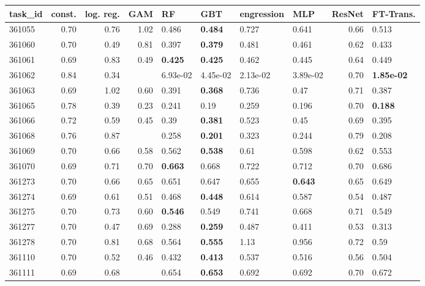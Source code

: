 \begin{table}[ht!]
\centering
\begingroup\footnotesize
\begin{tabular}{lrrrllllrl}
  \hline
\hline
task\_id & const. & log. reg. & GAM & RF & GBT & engression & MLP & ResNet & FT-Trans. \\ 
  \hline
361055 & 0.70 & 0.76 & 1.02 & 0.486 & \textbf{0.484} & 0.727 & 0.641 & 0.66 & 0.513 \\ 
  361060 & 0.70 & 0.49 & 0.81 & 0.397 & \textbf{0.379} & 0.481 & 0.461 & 0.62 & 0.433 \\ 
  361061 & 0.69 & 0.83 & 0.49 & \textbf{0.425} & \textbf{0.425} & 0.462 & 0.445 & 0.64 & 0.449 \\ 
  361062 & 0.84 & 0.34 &  & 6.93e-02 & 4.45e-02 & 2.13e-02 & 3.89e-02 & 0.70 & \textbf{1.85e-02} \\ 
  361063 & 0.69 & 1.02 & 0.60 & 0.391 & \textbf{0.368} & 0.736 & 0.47 & 0.71 & 0.387 \\ 
  361065 & 0.78 & 0.39 & 0.23 & 0.241 & 0.19 & 0.259 & 0.196 & 0.70 & \textbf{0.188} \\ 
  361066 & 0.72 & 0.59 & 0.45 & 0.39 & \textbf{0.381} & 0.523 & 0.45 & 0.69 & 0.395 \\ 
  361068 & 0.76 & 0.87 &  & 0.258 & \textbf{0.201} & 0.323 & 0.244 & 0.79 & 0.208 \\ 
  361069 & 0.70 & 0.66 & 0.58 & 0.562 & \textbf{0.538} & 0.61 & 0.598 & 0.62 & 0.553 \\ 
  361070 & 0.69 & 0.71 & 0.70 & \textbf{0.663} & 0.668 & 0.722 & 0.712 & 0.70 & 0.686 \\ 
  361273 & 0.70 & 0.66 & 0.65 & 0.651 & 0.647 & 0.655 & \textbf{0.643} & 0.65 & 0.649 \\ 
  361274 & 0.69 & 0.61 & 0.51 & 0.468 & \textbf{0.448} & 0.614 & 0.587 & 0.54 & 0.487 \\ 
  361275 & 0.70 & 0.73 & 0.60 & \textbf{0.546} & 0.549 & 0.741 & 0.668 & 0.71 & 0.549 \\ 
  361277 & 0.70 & 0.47 & 0.69 & 0.288 & \textbf{0.259} & 0.487 & 0.411 & 0.53 & 0.313 \\ 
  361278 & 0.70 & 0.81 & 0.68 & 0.564 & \textbf{0.555} & 1.13 & 0.956 & 0.72 & 0.59 \\ 
  361110 & 0.70 & 0.52 & 0.46 & 0.432 & \textbf{0.413} & 0.537 & 0.516 & 0.56 & 0.504 \\ 
  361111 & 0.69 & 0.68 &  & 0.654 & \textbf{0.653} & 0.692 & 0.692 & 0.70 & 0.672 \\ 

\end{tabular}
\end{table}
